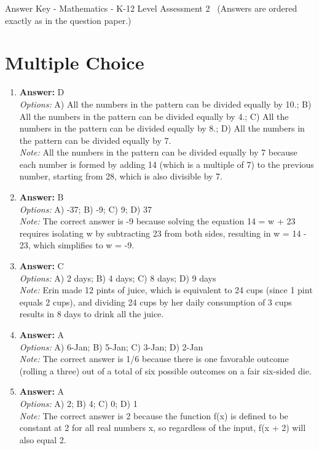 \documentclass[12pt]{article}
\begin{document}
\begin{center}
Answer Key - Mathematics - K-12 Level Assessment 2 \
\small (Answers are ordered exactly as in the question paper.)
\end{center}

\section*{Multiple Choice}
\begin{enumerate}[label=\arabic*.]
\item \textbf{Answer:} D
\\ \textit{Options:} A) All the numbers in the pattern can be divided equally by 10.; B) All the numbers in the pattern can be divided equally by 4.; C) All the numbers in the pattern can be divided equally by 8.; D) All the numbers in the pattern can be divided equally by 7.
\\ \textit{Note:} All the numbers in the pattern can be divided equally by 7 because each number is formed by adding 14 (which is a multiple of 7) to the previous number, starting from 28, which is also divisible by 7.
\item \textbf{Answer:} B
\\ \textit{Options:} A) -37; B) -9; C) 9; D) 37
\\ \textit{Note:} The correct answer is -9 because solving the equation 14 = w + 23 requires isolating w by subtracting 23 from both sides, resulting in w = 14 - 23, which simplifies to w = -9.
\item \textbf{Answer:} C
\\ \textit{Options:} A) 2 days; B) 4 days; C) 8 days; D) 9 days
\\ \textit{Note:} Erin made 12 pints of juice, which is equivalent to 24 cups (since 1 pint equals 2 cups), and dividing 24 cups by her daily consumption of 3 cups results in 8 days to drink all the juice.
\item \textbf{Answer:} A
\\ \textit{Options:} A) 6-Jan; B) 5-Jan; C) 3-Jan; D) 2-Jan
\\ \textit{Note:} The correct answer is 1/6 because there is one favorable outcome (rolling a three) out of a total of six possible outcomes on a fair six-sided die.
\item \textbf{Answer:} A
\\ \textit{Options:} A) 2; B) 4; C) 0; D) 1
\\ \textit{Note:} The correct answer is 2 because the function f(x) is defined to be constant at 2 for all real numbers x, so regardless of the input, f(x + 2) will also equal 2.
\end{enumerate}
\end{document}
